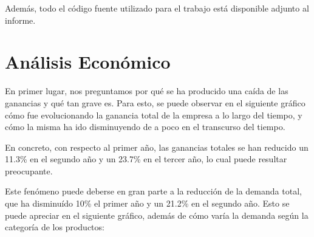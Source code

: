 \documentclass[12pt,a4paper]{article}
\begin{document}
\vspace{0.2cm}

Además, todo el código fuente utilizado para el trabajo está disponible adjunto al informe.



\newpage

\section{Análisis Económico}

En primer lugar, nos preguntamos por qué se ha producido una caída de las ganancias y qué tan grave es. Para esto, se puede observar 
en el siguiente gráfico cómo fue evolucionando la ganancia total de la empresa a lo largo del tiempo, y cómo la misma ha ido disminuyendo de a poco 
en el transcurso del tiempo.

\begin{center}
\end{center}

En concreto, con respecto al primer año, las ganancias totales se han reducido un 11.3\% en el segundo año y un 23.7\% en el tercer año, 
lo cual puede resultar preocupante.

\vspace{0.2cm}

Este fenómeno puede deberse en gran parte a la reducción de la demanda total, que ha disminuído 10\% el primer año y un 21.2\% en el segundo año. 
Esto se puede apreciar en el siguiente gráfico, además de cómo varía la demanda según la categoría de los productos:

\begin{center}
\end{center}
\end{document}
